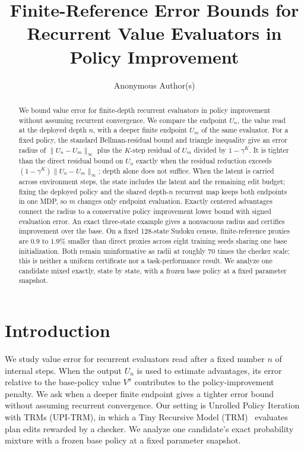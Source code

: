 \documentclass{article}
\title{Finite-Reference Error Bounds for\\ Recurrent Value Evaluators in\\ Policy Improvement}
\author{%
  Anonymous Author(s)
}
\theoremstyle{plain}
\theoremstyle{definition}
\theoremstyle{remark}
\begin{document}
\maketitle
\begin{abstract}
We bound value error for finite-depth recurrent evaluators in policy
improvement without assuming recurrent convergence. We compare the endpoint
$U_n$, the value read at the deployed depth $n$, with a deeper finite
endpoint $U_m$ of the same evaluator. For a fixed policy, the standard
Bellman-residual bound and triangle inequality give an error radius of
$\|U_n-U_m\|_\infty$ plus the $K$-step residual of $U_m$ divided by
$1-\gamma^K$. It is tighter than the direct residual bound on $U_n$ exactly
when the residual reduction exceeds $(1-\gamma^K)\|U_n-U_m\|_\infty$; depth
alone does not suffice. When the latent is carried across environment
steps, the state includes the latent and the remaining edit budget; fixing
the deployed policy and the shared depth-$n$ recurrent map keeps both
endpoints in one MDP, so $m$ changes only endpoint evaluation. Exactly
centered advantages connect the radius to a conservative policy improvement
lower bound with signed evaluation error. An exact three-state example gives
a nonvacuous radius and certifies improvement over the base. On a fixed
128-state Sudoku census, finite-reference proxies are $0.9$ to $1.9\%$
smaller than direct proxies across eight training seeds sharing one base
initialization. Both remain uninformative as radii at roughly 70 times the
checker scale; this is neither a uniform certificate nor a
task-performance result. We analyze one candidate mixed exactly, state by
state, with a frozen base policy at a fixed parameter snapshot.

\end{abstract}

\section{Introduction}
\label{sec:intro}

We study value error for recurrent evaluators read after a fixed number
$n$ of internal steps. When the output $U_n$ is used to estimate
advantages, its error relative to the base-policy value $V^\pi$ contributes
to the policy-improvement penalty. We ask when a deeper finite endpoint
gives a tighter error bound without assuming recurrent convergence.
Our setting is Unrolled Policy Iteration with TRMs (UPI-TRM), in which a
Tiny Recursive Model (TRM)~\citep{TRM2025} evaluates plan edits rewarded by
a checker. We analyze one candidate's exact probability mixture with a
frozen base policy at a fixed parameter snapshot.
\end{document}
